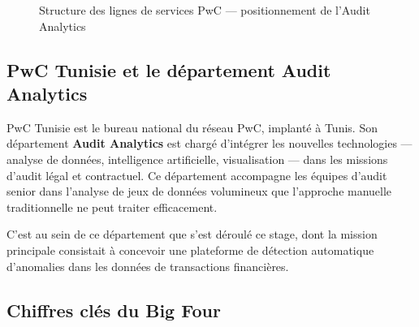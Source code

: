 \documentclass[12pt,a4paper,twoside]{report}
\theoremstyle{definition}
\begin{document}
\begin{figure}[H]
\centering
{}
\caption{Structure des lignes de services PwC — positionnement de l'Audit Analytics}
\label{fig:pwc_structure}
\end{figure}

\subsection{PwC Tunisie et le département Audit Analytics}

PwC Tunisie est le bureau national du réseau PwC, implanté à Tunis. Son département
\textbf{Audit Analytics} est chargé d'intégrer les nouvelles technologies — analyse
de données, intelligence artificielle, visualisation — dans les missions d'audit
légal et contractuel. Ce département accompagne les équipes d'audit senior dans
l'analyse de jeux de données volumineux que l'approche manuelle traditionnelle ne
peut traiter efficacement.

C'est au sein de ce département que s'est déroulé ce stage, dont la mission
principale consistait à concevoir une plateforme de détection automatique d'anomalies
dans les données de transactions financières.

\subsection{Chiffres clés du Big Four}
\end{document}

